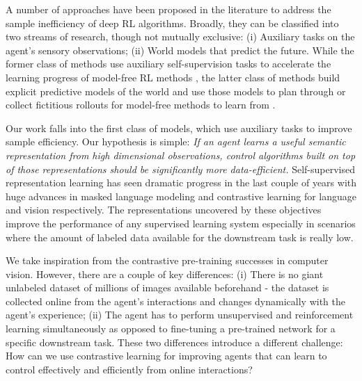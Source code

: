 \documentclass{article}
\begin{document}
A number of approaches have been proposed in the literature to address the sample inefficiency of deep RL algorithms. Broadly, they can be classified into two streams of research, though not mutually exclusive: (i) Auxiliary tasks on the agent's sensory observations; (ii) World models that predict the future. While the former class of methods use auxiliary self-supervision tasks to accelerate the learning progress of model-free RL methods \cite{jaderberg2016reinforcement, mirowski2016learning}, the latter class of methods build explicit predictive models of the world and use those models to plan through or collect fictitious rollouts for model-free methods to learn from \cite{sutton1990integrated, ha2018world, kaiser2019model, schrittwieser2019mastering}.


Our work falls into the first class of models, which use auxiliary tasks to improve sample efficiency. Our hypothesis is simple: {\it If an agent learns a useful semantic representation from high dimensional observations, control algorithms built on top of those representations should be significantly more data-efficient.} Self-supervised representation learning has seen dramatic progress in the last couple of years with huge advances in masked language modeling \cite{devlin2018bert} and contrastive learning \cite{henaff2019data, he2019momentum, chen2020simclr} for language and vision respectively. The representations uncovered by these objectives improve the performance of any supervised learning system especially in scenarios where the amount of labeled data available for the downstream task is really low. 


We take inspiration from the contrastive pre-training successes in computer vision. However, there are a couple of key differences: (i) There is no giant unlabeled dataset of millions of images available beforehand - the dataset is collected online from the agent's interactions and changes dynamically with the agent's experience; (ii) The agent has to perform unsupervised and reinforcement learning simultaneously as opposed to fine-tuning a pre-trained network for a specific downstream task. These two differences introduce a different challenge: How can we use contrastive learning for improving agents that can learn to control effectively and efficiently from online interactions? 
\end{document}
